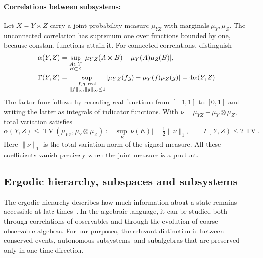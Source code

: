 \documentclass[a4paper,11pt]{article}
\theoremstyle{definition}
\newcommand{\nn}{\nonumber}
\begin{document}
\paragraph{Correlations between subsystems:}
Let $X=Y\times Z$ carry a joint probability measure $\mu_{YZ}$ with marginals
$\mu_Y,\mu_Z$. The unconnected correlation has supremum one over functions bounded
by one, because constant functions attain it. For connected correlations, distinguish
\begin{align}
 \alpha(Y,Z)&=\sup_{\substack{A\subset Y\\B\subset Z}}
 |\mu_{YZ}(A\times B)-\mu_Y(A)\mu_Z(B)|,\nn\\
 \Gamma(Y,Z)&=\sup_{\substack{f,g\ {\rm real}\\\|f\|_\infty,\|g\|_\infty\leq1}}
 |\mu_{YZ}(fg)-\mu_Y(f)\mu_Z(g)|=4\alpha(Y,Z).
\end{align}
The factor four follows by rescaling real functions from $[-1,1]$ to $[0,1]$
and writing the latter as integrals of indicator functions. With
$\nu=\mu_{YZ}-\mu_Y\otimes\mu_Z$, total variation satisfies
\begin{equation}
 \alpha(Y,Z)\leq\operatorname{TV}(\mu_{YZ},\mu_Y\otimes\mu_Z)
 :=\sup_E|\nu(E)|=\tfrac12\|\nu\|_1,
 \qquad \Gamma(Y,Z)\leq2\operatorname{TV}.
\end{equation}
Here $\|\nu\|_1$ is the total variation norm of the signed measure. All these
coefficients vanish precisely when the joint measure is a product.



\subsection{Ergodic hierarchy, subspaces and subsystems}
\label{subsec:classical-ergodic-hierarchy}

The ergodic hierarchy describes how much information about a state remains accessible at late times~\cite{CornfeldFominSinai1982}. In the algebraic language, it can be studied both through correlations of observables and through the evolution of coarse observable algebras. For our purposes, the relevant distinction is between conserved events, autonomous subsystems, and subalgebras that are preserved only in one time direction.
\end{document}
